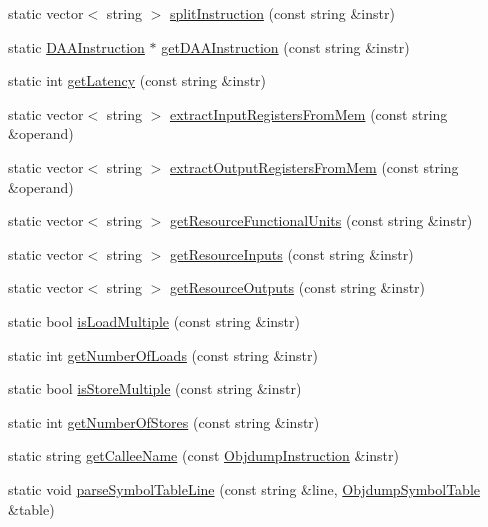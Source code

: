 \begin{DoxyCompactItemize}
\item 
static vector$<$ string $>$ \hyperlink{classArch_a02fb24c4a3666859e5d503b370f980ec}{split\+Instruction} (const string \&instr)
\item 
static \hyperlink{classDAAInstruction}{D\+A\+A\+Instruction} $\ast$ \hyperlink{classArch_a056d89310ba797b493afff641bcc15c6}{get\+D\+A\+A\+Instruction} (const string \&instr)
\item 
static int \hyperlink{classArch_a4d1796b17b9dbaabed38ab10b8057013}{get\+Latency} (const string \&instr)
\item 
static vector$<$ string $>$ \hyperlink{classArch_ad43d2ee62f26a9fa2e193fa3a6cc8935}{extract\+Input\+Registers\+From\+Mem} (const string \&operand)
\item 
static vector$<$ string $>$ \hyperlink{classArch_a620da5dee3720e53e49e97ce6d7b3e0f}{extract\+Output\+Registers\+From\+Mem} (const string \&operand)
\item 
static vector$<$ string $>$ \hyperlink{classArch_a422c4ccd83e3652e7f11158272198397}{get\+Resource\+Functional\+Units} (const string \&instr)
\item 
static vector$<$ string $>$ \hyperlink{classArch_ac228ffb5a673b5250d0517a5bf6813b4}{get\+Resource\+Inputs} (const string \&instr)
\item 
static vector$<$ string $>$ \hyperlink{classArch_a368512825e8cdad354097faf60101ec1}{get\+Resource\+Outputs} (const string \&instr)
\item 
static bool \hyperlink{classArch_ad75950a3993e9fd3a94cb62a8211d2b3}{is\+Load\+Multiple} (const string \&instr)
\item 
static int \hyperlink{classArch_a3d6b18c0c59e806230a51f42a0373f1f}{get\+Number\+Of\+Loads} (const string \&instr)
\item 
static bool \hyperlink{classArch_a54f415f6f7c8adbc0cbd0a48f57f4fb1}{is\+Store\+Multiple} (const string \&instr)
\item 
static int \hyperlink{classArch_a16b3caaf64787815c74d2a1e73ccc64e}{get\+Number\+Of\+Stores} (const string \&instr)
\item 
static string \hyperlink{classArch_aa12bd08c634af2d42ea31a51461608eb}{get\+Callee\+Name} (const \hyperlink{classObjdumpInstruction}{Objdump\+Instruction} \&instr)
\item 
static void \hyperlink{classArch_a37495eac849d7f1e895656c67f28048c}{parse\+Symbol\+Table\+Line} (const string \&line, \hyperlink{classObjdumpSymbolTable}{Objdump\+Symbol\+Table} \&table)
\item 

\end{DoxyCompactItemize}
